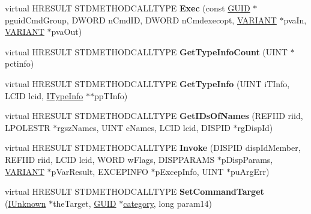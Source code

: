 \begin{DoxyCompactItemize}
virtual H\+R\+E\+S\+U\+LT S\+T\+D\+M\+E\+T\+H\+O\+D\+C\+A\+L\+L\+T\+Y\+PE {\bfseries Exec} (const \hyperlink{interface_g_u_i_d}{G\+U\+ID} $\ast$pguid\+Cmd\+Group, D\+W\+O\+RD n\+Cmd\+ID, D\+W\+O\+RD n\+Cmdexecopt, \hyperlink{structtag_v_a_r_i_a_n_t}{V\+A\+R\+I\+A\+NT} $\ast$pva\+In, \hyperlink{structtag_v_a_r_i_a_n_t}{V\+A\+R\+I\+A\+NT} $\ast$pva\+Out)
\item 
\mbox{\label{class_c_internet_toolbar_a5dea73b861f1f708271b59e2e59f3489}} 
virtual H\+R\+E\+S\+U\+LT S\+T\+D\+M\+E\+T\+H\+O\+D\+C\+A\+L\+L\+T\+Y\+PE {\bfseries Get\+Type\+Info\+Count} (U\+I\+NT $\ast$pctinfo)
\item 
\mbox{\label{class_c_internet_toolbar_a1a228e1a09cd584e9104558a8c5632a3}} 
virtual H\+R\+E\+S\+U\+LT S\+T\+D\+M\+E\+T\+H\+O\+D\+C\+A\+L\+L\+T\+Y\+PE {\bfseries Get\+Type\+Info} (U\+I\+NT i\+T\+Info, L\+C\+ID lcid, \hyperlink{interface_i_type_info}{I\+Type\+Info} $\ast$$\ast$pp\+T\+Info)
\item 
\mbox{\label{class_c_internet_toolbar_a62f8c923aa482887260f733b18bb41c2}} 
virtual H\+R\+E\+S\+U\+LT S\+T\+D\+M\+E\+T\+H\+O\+D\+C\+A\+L\+L\+T\+Y\+PE {\bfseries Get\+I\+Ds\+Of\+Names} (R\+E\+F\+I\+ID riid, L\+P\+O\+L\+E\+S\+TR $\ast$rgsz\+Names, U\+I\+NT c\+Names, L\+C\+ID lcid, D\+I\+S\+P\+ID $\ast$rg\+Disp\+Id)
\item 
\mbox{\label{class_c_internet_toolbar_abe7f70c13ceb8d060ab54cdeb681e2ac}} 
virtual H\+R\+E\+S\+U\+LT S\+T\+D\+M\+E\+T\+H\+O\+D\+C\+A\+L\+L\+T\+Y\+PE {\bfseries Invoke} (D\+I\+S\+P\+ID disp\+Id\+Member, R\+E\+F\+I\+ID riid, L\+C\+ID lcid, W\+O\+RD w\+Flags, D\+I\+S\+P\+P\+A\+R\+A\+MS $\ast$p\+Disp\+Params, \hyperlink{structtag_v_a_r_i_a_n_t}{V\+A\+R\+I\+A\+NT} $\ast$p\+Var\+Result, E\+X\+C\+E\+P\+I\+N\+FO $\ast$p\+Excep\+Info, U\+I\+NT $\ast$pu\+Arg\+Err)
\item 
\mbox{\label{class_c_internet_toolbar_a0ed8116e126021444faebb440a7d15ba}} 
virtual H\+R\+E\+S\+U\+LT S\+T\+D\+M\+E\+T\+H\+O\+D\+C\+A\+L\+L\+T\+Y\+PE {\bfseries Set\+Command\+Target} (\hyperlink{interface_i_unknown}{I\+Unknown} $\ast$the\+Target, \hyperlink{interface_g_u_i_d}{G\+U\+ID} $\ast$\hyperlink{structcategory}{category}, long param14)
\item 
$$
\end{DoxyCompactItemize}
